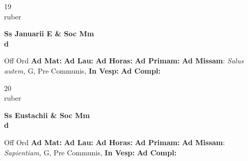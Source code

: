 \documentclass[10pt, openany]{book}
\begin{document}
    \begin{center}
        \begin{minipage}{3.5in}
            \vspace{2em}
            \begin{minipage}{0.5in}
                {\Huge 19} \\
                {\normalsize ruber}
            \end{minipage}
            \begin{minipage}{3.0in}
                \textbf{ \large Ss Januarii E \& Soc Mm \\
                \textnormal{\normalsize d}}

            \end{minipage}
            \begin{justify}Off Ord
                \textbf{Ad Mat: }
                \textbf{Ad Lau: }
                \textbf{Ad Horas: }
                \textbf{Ad Primam: }\textbf{Ad Missam}: \textit{Salus autem,} G, Pre Communis, 
                \textbf{In Vesp: }
                \textbf{Ad Compl: }
            \end{justify}
        \end{minipage}
    \end{center}

    \begin{center}
        \begin{minipage}{3.5in}
            \vspace{2em}
            \begin{minipage}{0.5in}
                {\Huge 20} \\
                {\normalsize ruber}
            \end{minipage}
            \begin{minipage}{3.0in}
                \textbf{ \large Ss Eustachii \& Soc Mm \\
                \textnormal{\normalsize d}}

            \end{minipage}
            \begin{justify}Off Ord
                \textbf{Ad Mat: }
                \textbf{Ad Lau: }
                \textbf{Ad Horas: }
                \textbf{Ad Primam: }\textbf{Ad Missam}: \textit{Sapientiam,} G, Pre Communis, 
                \textbf{In Vesp: }
                \textbf{Ad Compl: }
            \end{justify}
        \end{minipage}
    \end{center}
\end{document}
